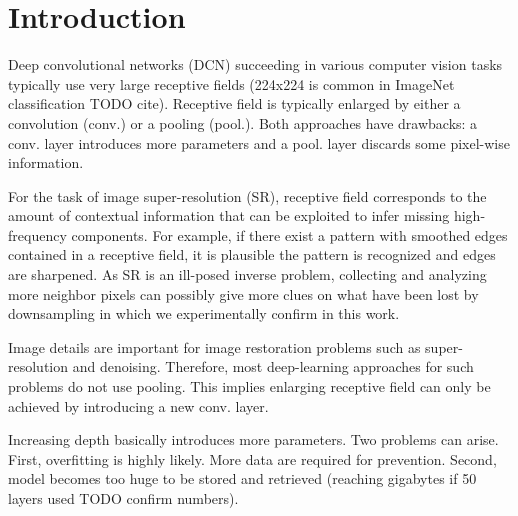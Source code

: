 \documentclass[10pt,twocolumn,letterpaper]{article}
\begin{document}
\section{Introduction}
Deep convolutional networks (DCN) succeeding in various computer vision tasks typically use very large receptive fields  (224x224 is common in ImageNet classification TODO cite). Receptive field is typically enlarged by either a convolution (conv.) or a pooling (pool.).  Both approaches have drawbacks: a conv. layer introduces more parameters and a pool. layer discards some pixel-wise information. 


For the task of image super-resolution (SR), receptive field corresponds to the amount of contextual information that can be exploited to infer missing high-frequency components. For example, if there exist a pattern with smoothed edges contained in a receptive field, it is plausible the pattern is recognized and edges are sharpened. As SR is an ill-posed inverse problem, collecting and analyzing more neighbor pixels can possibly give more clues on what have been lost by downsampling in which we experimentally confirm in this work.  

Image details are important for image restoration problems such as super-resolution and denoising. Therefore, most deep-learning approaches for such problems do not use pooling. This implies enlarging receptive field can only be achieved by introducing a new conv. layer.

Increasing depth basically introduces more parameters. Two problems can arise. First, overfitting is highly likely. More data are required for prevention. Second, model becomes too huge to be stored and retrieved (reaching gigabytes if 50 layers used TODO confirm numbers).

 

\end{document}
